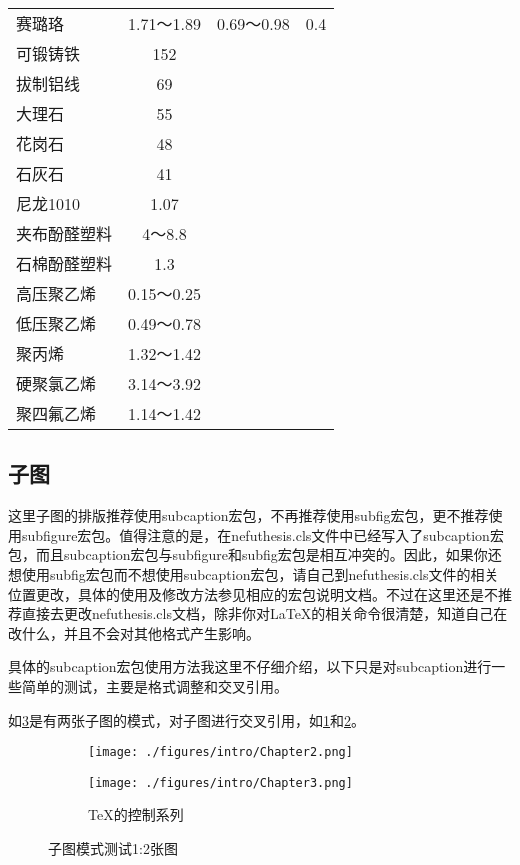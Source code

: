 \begin{longtabu}{lccc}
	赛璐珞    &  1.71～1.89 &  0.69～0.98 & 0.4 \\
	可锻铸铁   & 152    &        &  \\
	拔制铝线   & 69     &        &  \\
	大理石    & 55     &        &  \\
	花岗石    & 48     &        &  \\
	石灰石    & 41     &        &  \\
	尼龙1010 & 1.07   &        &  \\
	夹布酚醛塑料 &  4～8.8 &        &  \\
	石棉酚醛塑料 & 1.3    &        &  \\
	高压聚乙烯  &  0.15～0.25 &        &  \\
	低压聚乙烯  &  0.49～0.78 &        &  \\
	聚丙烯    &  1.32～1.42 &        &  \\
	硬聚氯乙烯  &  3.14～3.92 &        &  \\
	聚四氟乙烯  &  1.14～1.42 &        &  \\
\end{longtabu}%

\subsection{子图}
这里子图的排版推荐使用subcaption宏包，不再推荐使用subfig宏包，更不推荐使用subfigure宏包。值得注意的是，在nefuthesis.cls文件中已经写入了subcaption宏包，而且subcaption宏包与subfigure和subfig宏包是相互冲突的。因此，如果你还想使用subfig宏包而不想使用subcaption宏包，请自己到nefuthesis.cls文件的相关位置更改，具体的使用及修改方法参见相应的宏包说明文档。不过在这里还是不推荐直接去更改nefuthesis.cls文档，除非你对\LaTeX 的相关命令很清楚，知道自己在改什么，并且不会对其他格式产生影响。

具体的subcaption宏包使用方法我这里不仔细介绍，以下只是对subcaption进行一些简单的测试，主要是格式调整和交叉引用。

如\ref{fig:subfig_test1}是有两张子图的模式，对子图进行交叉引用，如\ref{subfig:1a}和\ref{subfig:1b}。
\begin{figure}[htbp]
	\centering
	\begin{subfigure}[b]{.4\textwidth}
		\centering
		\texttt{[image: ./figures/intro/Chapter2.png]}
		\label{subfig:1a}
	\end{subfigure}
	\quad
	\begin{subfigure}[b]{.4\textwidth}
		\centering
		\texttt{[image: ./figures/intro/Chapter3.png]}
		\caption{\TeX 的控制系列}\label{subfig:1b}
	\end{subfigure}
	\caption{子图模式测试1:2张图}\label{fig:subfig_test1}
\end{figure}

